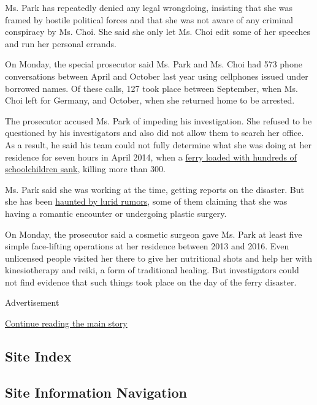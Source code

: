 Ms. Park has repeatedly denied any legal wrongdoing, insisting that she
was framed by hostile political forces and that she was not aware of any
criminal conspiracy by Ms. Choi. She said she only let Ms. Choi edit
some of her speeches and run her personal errands.

On Monday, the special prosecutor said Ms. Park and Ms. Choi had 573
phone conversations between April and October last year using cellphones
issued under borrowed names. Of these calls, 127 took place between
September, when Ms. Choi left for Germany, and October, when she
returned home to be arrested.

The prosecutor accused Ms. Park of impeding his investigation. She
refused to be questioned by his investigators and also did not allow
them to search her office. As a result, he said his team could not fully
determine what she was doing at her residence for seven hours in April
2014, when a
\href{https://www.nytimes.com/2014/04/17/world/asia/south-korean-ferry-accident.html}{ferry
loaded with hundreds of schoolchildren sank}, killing more than 300.

Ms. Park said she was working at the time, getting reports on the
disaster. But she has been
\href{https://www.nytimes.com/2015/12/18/world/asia/south-korea-park-geun-hye-defamation-verdict.html}{haunted
by lurid rumors}, some of them claiming that she was having a romantic
encounter or undergoing plastic surgery.

On Monday, the prosecutor said a cosmetic surgeon gave Ms. Park at least
five simple face-lifting operations at her residence between 2013 and
2016. Even unlicensed people visited her there to give her nutritional
shots and help her with kinesiotherapy and reiki, a form of traditional
healing. But investigators could not find evidence that such things took
place on the day of the ferry disaster.

Advertisement

\protect\hyperlink{after-bottom}{Continue reading the main story}

\hypertarget{site-index}{%
\subsection{Site Index}\label{site-index}}

\hypertarget{site-information-navigation}{%
\subsection{Site Information
Navigation}\label{site-information-navigation}}

